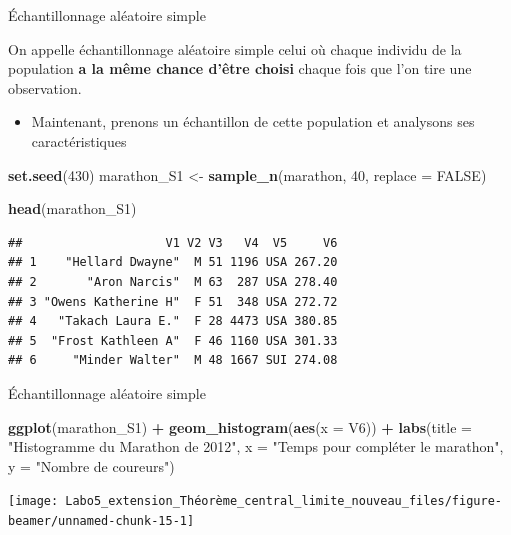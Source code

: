 \documentclass[ignorenonframetext,]{beamer}
\newenvironment{Shaded}{\begin{snugshade}}{\end{snugshade}}
\newcommand{\KeywordTok}[1]{\textcolor[rgb]{0.13,0.29,0.53}{\textbf{#1}}}
\newcommand{\DataTypeTok}[1]{\textcolor[rgb]{0.13,0.29,0.53}{#1}}
\newcommand{\DecValTok}[1]{\textcolor[rgb]{0.00,0.00,0.81}{#1}}
\newcommand{\StringTok}[1]{\textcolor[rgb]{0.31,0.60,0.02}{#1}}
\newcommand{\OtherTok}[1]{\textcolor[rgb]{0.56,0.35,0.01}{#1}}
\newcommand{\OperatorTok}[1]{\textcolor[rgb]{0.81,0.36,0.00}{\textbf{#1}}}
\newcommand{\NormalTok}[1]{#1}
\providecommand{\tightlist}{%
  \setlength{\itemsep}{0pt}\setlength{\parskip}{0pt}}
\begin{document}
\begin{frame}[fragile]{Échantillonnage aléatoire simple}

On appelle échantillonnage aléatoire simple celui où chaque individu de
la population \textbf{a la même chance d'être choisi} chaque fois que
l'on tire une observation.

\begin{itemize}
\tightlist
\item
  Maintenant, prenons un échantillon de cette population et analysons
  ses caractéristiques
\end{itemize}

\begin{Shaded}
\begin{Highlighting}[]
\KeywordTok{set.seed}\NormalTok{(}\DecValTok{430}\NormalTok{)}
\NormalTok{marathon_S1 <-}\StringTok{ }\KeywordTok{sample_n}\NormalTok{(marathon, }\DecValTok{40}\NormalTok{, }\DataTypeTok{replace =} \OtherTok{FALSE}\NormalTok{)}

\KeywordTok{head}\NormalTok{(marathon_S1)}
\end{Highlighting}
\end{Shaded}

\begin{verbatim}
##                    V1 V2 V3   V4  V5     V6
## 1    "Hellard Dwayne"  M 51 1196 USA 267.20
## 2       "Aron Narcis"  M 63  287 USA 278.40
## 3 "Owens Katherine H"  F 51  348 USA 272.72
## 4   "Takach Laura E."  F 28 4473 USA 380.85
## 5  "Frost Kathleen A"  F 46 1160 USA 301.33
## 6     "Minder Walter"  M 48 1667 SUI 274.08
\end{verbatim}

\end{frame}

\begin{frame}[fragile]{Échantillonnage aléatoire simple}

\begin{Shaded}
\begin{Highlighting}[]
\KeywordTok{ggplot}\NormalTok{(marathon_S1) }\OperatorTok{+}
\StringTok{  }\KeywordTok{geom_histogram}\NormalTok{(}\KeywordTok{aes}\NormalTok{(}\DataTypeTok{x =}\NormalTok{ V6)) }\OperatorTok{+}
\StringTok{  }\KeywordTok{labs}\NormalTok{(}\DataTypeTok{title =} \StringTok{"Histogramme du Marathon de 2012"}\NormalTok{,}
       \DataTypeTok{x =} \StringTok{"Temps pour compléter le marathon"}\NormalTok{,}
       \DataTypeTok{y =} \StringTok{"Nombre de coureurs"}\NormalTok{)}
\end{Highlighting}
\end{Shaded}

\texttt{[image: Labo5\_extension\_Théorème\_central\_limite\_nouveau\_files/figure-beamer/unnamed-chunk-15-1]}

\end{frame}
\end{document}

